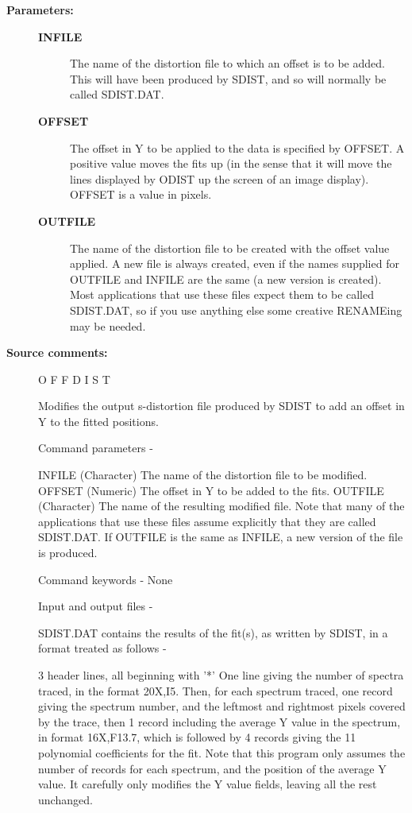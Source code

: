 \begin{description}
\begin{description}
\item [\textbf{Parameters:}]
\begin{description}
\item [\textbf{INFILE}]
 The name of the distortion file to
 which an offset is to be added.  This will have been
 produced by SDIST, and so will normally be called
 SDIST.DAT.
\item [\textbf{OFFSET}]
 The offset in Y to be applied to the data is specified
 by OFFSET.  A positive value moves the fits up (in the
 sense that it will move the lines displayed by ODIST
 up the screen of an image display).  OFFSET is a value
 in pixels.
\item [\textbf{OUTFILE}]
 The name of the distortion file to be created with
 the offset value applied.  A new file is always
 created, even if the names supplied for OUTFILE and
 INFILE are the same (a new version is created).  Most
 applications that use these files expect them to be
 called SDIST.DAT, so if you use anything else some
 creative RENAMEing may be needed.
\end{description}

\item [\textbf{Source comments:}]
\begin{terminalv}
 O F F D I S T

 Modifies the output s-distortion file produced by SDIST
 to add an offset in Y to the fitted positions.

 Command parameters -

 INFILE    (Character) The name of the distortion file to
           be modified.
 OFFSET    (Numeric) The offset in Y to be added to the fits.
 OUTFILE   (Character) The name of the resulting modified file.
           Note that many of the applications that use these
           files assume explicitly that they are called SDIST.DAT.
           If OUTFILE is the same as INFILE, a new version of the
           file is produced.

 Command keywords - None

 Input and output files -

 SDIST.DAT contains the results of the fit(s), as written by
           SDIST, in a format treated as follows -

           3 header lines, all beginning with '*'
           One line giving the number of spectra traced, in the
           format 20X,I5.
           Then, for each spectrum traced, one record giving
           the spectrum number, and the leftmost and rightmost
           pixels covered by the trace, then 1 record including
           the average Y value in the spectrum, in format 16X,F13.7,
           which is followed by 4 records giving the 11
           polynomial coefficients for the fit.  Note that this
           program only assumes the number of records for each
           spectrum, and the position of the average Y value.  It
           carefully only modifies the Y value fields, leaving all
           the rest unchanged.
\end{terminalv}
\end{description}

\end{description}

